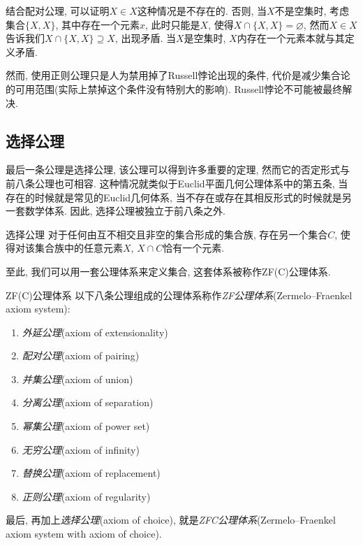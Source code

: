 结合配对公理, 可以证明$X \in X$这种情况是不存在的. 否则, 当$X$不是空集时, 考虑集合$\{ X, X \}$, 其中存在一个元素$x$, 此时只能是$X$, 使得$X \cap \{ X, X \}=\varnothing$, 然而$X \in X$告诉我们$X \cap \{ X, X \} \supseteq X$, 出现矛盾. 当$X$是空集时, $X$内存在一个元素本就与其定义矛盾.

然而, 使用正则公理只是人为禁用掉了Russell悖论出现的条件, 代价是减少集合论的可用范围(实际上禁掉这个条件没有特别大的影响). Russell悖论不可能被最终解决.

\subsection{选择公理}

最后一条公理是选择公理, 该公理可以得到许多重要的定理, 然而它的否定形式与前八条公理也可相容. 这种情况就类似于Euclid平面几何公理体系中的第五条, 当存在的时候就是常见的Euclid几何体系, 当不存在或存在其相反形式的时候就是另一套数学体系. 因此, 选择公理被独立于前八条之外. 

\begin{axiom}{选择公理}
	对于任何由互不相交且非空的集合形成的集合族, 存在另一个集合$C$, 使得对该集合族中的任意元素$X$, $X \cap C$恰有一个元素.
\end{axiom}

至此, 我们可以用一套公理体系来定义集合, 这套体系被称作ZF(C)公理体系.

\begin{definition}{ZF(C)公理体系}
	以下八条公理组成的公理体系称作\textit{ZF公理体系}(Zermelo–Fraenkel axiom system): 
	\begin{enumerate}
		\item \textit{外延公理}(axiom of extensionality)
		\item \textit{配对公理}(axiom of pairing)
		\item \textit{并集公理}(axiom of union)
		\item \textit{分离公理}(axiom of separation)
		\item \textit{幂集公理}(axiom of power set)
		\item \textit{无穷公理}(axiom of infinity)
		\item \textit{替换公理}(axiom of replacement)
		\item \textit{正则公理}(axiom of regularity)
	\end{enumerate}
	最后, 再加上\textit{选择公理}(axiom of choice), 就是\textit{ZFC公理体系}(Zermelo–Fraenkel axiom system with axiom of choice).
\end{definition}

